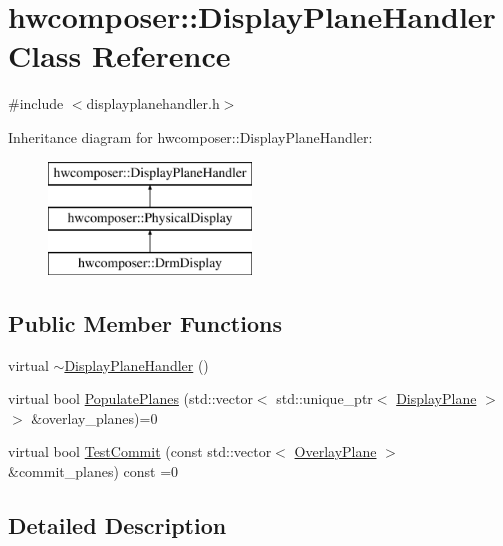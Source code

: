 \hypertarget{classhwcomposer_1_1DisplayPlaneHandler}{}\section{hwcomposer\+:\+:Display\+Plane\+Handler Class Reference}
\label{classhwcomposer_1_1DisplayPlaneHandler}


{\ttfamily \#include $<$displayplanehandler.\+h$>$}

Inheritance diagram for hwcomposer\+:\+:Display\+Plane\+Handler\+:\begin{figure}[H]
\begin{center}
\leavevmode
\includegraphics[height=3.000000cm]{classhwcomposer_1_1DisplayPlaneHandler}
\end{center}
\end{figure}
\subsection*{Public Member Functions}
\begin{DoxyCompactItemize}
\item 
virtual \mbox{\hyperlink{classhwcomposer_1_1DisplayPlaneHandler_aeab8a4a0c1db272293b3b6db6c7cd7b6}{$\sim$\+Display\+Plane\+Handler}} ()
\item 
virtual bool \mbox{\hyperlink{classhwcomposer_1_1DisplayPlaneHandler_aa4d32269c693dbf4a4c91c31ed577784}{Populate\+Planes}} (std\+::vector$<$ std\+::unique\+\_\+ptr$<$ \mbox{\hyperlink{classhwcomposer_1_1DisplayPlane}{Display\+Plane}} $>$$>$ \&overlay\+\_\+planes)=0
\item 
virtual bool \mbox{\hyperlink{classhwcomposer_1_1DisplayPlaneHandler_a1135b134010e6736aa49304100c9d3b9}{Test\+Commit}} (const std\+::vector$<$ \mbox{\hyperlink{structhwcomposer_1_1OverlayPlane}{Overlay\+Plane}} $>$ \&commit\+\_\+planes) const =0
\end{DoxyCompactItemize}


\subsection{Detailed Description}


